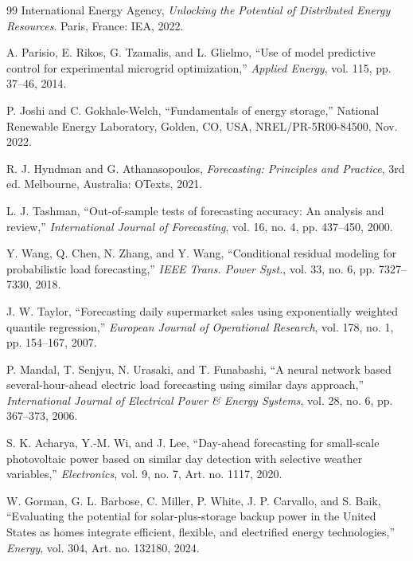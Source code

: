 \documentclass[withoutpreface,bwprint]{cumcmthesis}
\begin{document}
\begin{thebibliography}{99}
  \small
   International Energy Agency, \emph{Unlocking the Potential of
  Distributed Energy Resources}. Paris, France: IEA, 2022.

   A. Parisio, E. Rikos, G. Tzamalis, and L. Glielmo,
  ``Use of model predictive control for experimental microgrid optimization,''
  \emph{Applied Energy}, vol. 115, pp. 37--46, 2014.

   P. Joshi and C. Gokhale-Welch, ``Fundamentals of energy
  storage,'' National Renewable Energy Laboratory, Golden, CO, USA,
  NREL/PR-5R00-84500, Nov. 2022.

   R. J. Hyndman and G. Athanasopoulos,
  \emph{Forecasting: Principles and Practice}, 3rd ed. Melbourne, Australia:
  OTexts, 2021.

   L. J. Tashman, ``Out-of-sample tests of forecasting
  accuracy: An analysis and review,'' \emph{International Journal of Forecasting},
  vol. 16, no. 4, pp. 437--450, 2000.

   Y. Wang, Q. Chen, N. Zhang, and Y. Wang, ``Conditional
  residual modeling for probabilistic load forecasting,'' \emph{IEEE Trans. Power
  Syst.}, vol. 33, no. 6, pp. 7327--7330, 2018.

   J. W. Taylor, ``Forecasting daily supermarket sales using
  exponentially weighted quantile regression,'' \emph{European Journal of
  Operational Research}, vol. 178, no. 1, pp. 154--167, 2007.

   P. Mandal, T. Senjyu, N. Urasaki, and T. Funabashi,
  ``A neural network based several-hour-ahead electric load forecasting using
  similar days approach,'' \emph{International Journal of Electrical Power \&
  Energy Systems}, vol. 28, no. 6, pp. 367--373, 2006.

   S. K. Acharya, Y.-M. Wi, and J. Lee, ``Day-ahead
  forecasting for small-scale photovoltaic power based on similar day detection
  with selective weather variables,'' \emph{Electronics}, vol. 9, no. 7,
  Art. no. 1117, 2020.

   W. Gorman, G. L. Barbose, C. Miller, P. White,
  J. P. Carvallo, and S. Baik, ``Evaluating the
  potential for solar-plus-storage backup power in the United States as homes
  integrate efficient, flexible, and electrified energy technologies,''
  \emph{Energy}, vol. 304, Art. no. 132180, 2024.


\end{thebibliography}
\end{document}
